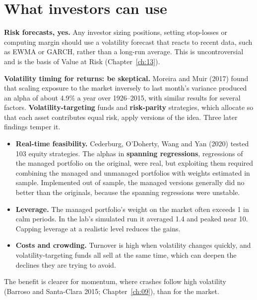 \section{What investors can use}
\label{sec:11-investors}

\textbf{Risk forecasts, yes.} Any investor sizing positions, setting stop-losses or computing margin should use a volatility forecast that reacts to recent data, such as EWMA or GARCH, rather than a long-run average. This is uncontroversial and is the basis of Value at Risk (Chapter~\ref{ch:13}).

\textbf{Volatility timing for returns: be skeptical.} Moreira and Muir (2017) found that scaling exposure to the market inversely to last month's variance produced an alpha of about 4.9\% a year over 1926--2015, with similar results for several factors. \textbf{Volatility-targeting} funds and \textbf{risk-parity} strategies, which allocate so that each asset contributes equal risk, apply versions of the idea. Three later findings temper it.

\begin{itemize}
  \item \textbf{Real-time feasibility.} Cederburg, O'Doherty, Wang and Yan (2020) tested 103 equity strategies. The alphas in \textbf{spanning regressions}, regressions of the managed portfolio on the original, were real, but exploiting them required combining the managed and unmanaged portfolios with weights estimated in sample. Implemented out of sample, the managed versions generally did no better than the originals, because the spanning regressions were unstable.
  \item \textbf{Leverage.} The managed portfolio's weight on the market often exceeds 1 in calm periods. In the lab's simulated run it averaged 1.4 and peaked near 10. Capping leverage at a realistic level reduces the gains.
  \item \textbf{Costs and crowding.} Turnover is high when volatility changes quickly, and volatility-targeting funds all sell at the same time, which can deepen the declines they are trying to avoid.
\end{itemize}

The benefit is clearer for momentum, where crashes follow high volatility (Barroso and Santa-Clara 2015; Chapter~\ref{ch:09}), than for the market.

